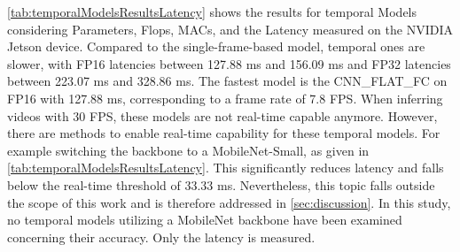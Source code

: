 \autoref{tab:temporalModelsResultsLatency} shows the results for temporal Models considering Parameters, Flops, MACs, and the Latency measured on the NVIDIA Jetson device.
Compared to the single-frame-based model, temporal ones are slower, with FP16 latencies between 127.88 ms and 156.09 ms and FP32 latencies between 223.07 ms and 328.86 ms.
The fastest model is the CNN\_FLAT\_FC on FP16 with 127.88 ms, corresponding to a frame rate of 7.8 \ac{FPS}.
When inferring videos with 30 \ac{FPS}, these models are not real-time capable anymore.
However, there are methods to enable real-time capability for these temporal models.
For example switching the backbone to a MobileNet-Small, as given in \autoref{tab:temporalModelsResultsLatency}.
This significantly reduces latency and falls below the real-time threshold of 33.33 ms.
Nevertheless, this topic falls outside the scope of this work and is therefore addressed in \autoref{sec:discussion}.
In this study, no temporal models utilizing a MobileNet backbone have been examined concerning their accuracy.
Only the latency is measured.
